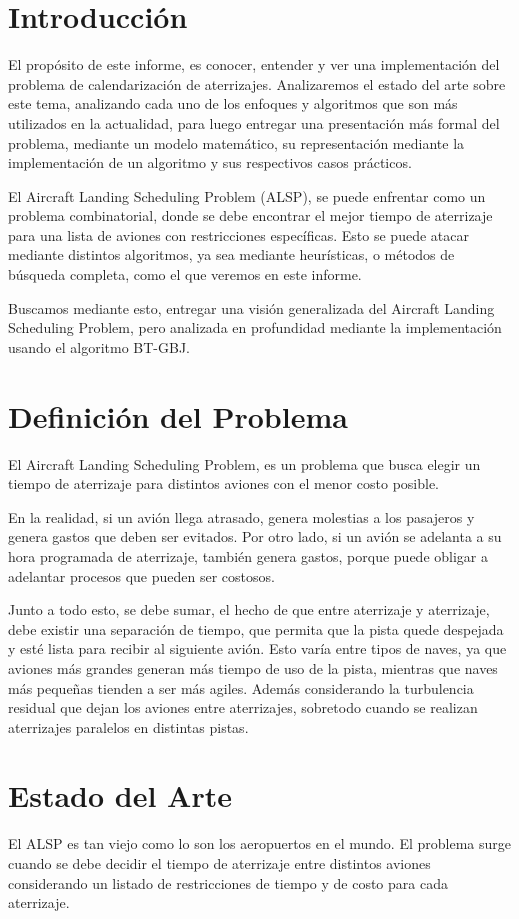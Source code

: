 \documentclass[letter, 11pt]{article}
\begin{document}
\section{Introducci\'on}
El propósito de este informe, es conocer, entender y ver una implementación del problema de calendarización de aterrizajes. Analizaremos el estado del arte sobre este tema, analizando cada uno de los enfoques y algoritmos que son más utilizados en la actualidad, para luego entregar una presentación más formal del problema, mediante un modelo matemático, su representación mediante la implementación de un algoritmo y sus respectivos casos prácticos.

El Aircraft Landing Scheduling Problem (ALSP), se puede enfrentar como un problema combinatorial, donde se debe encontrar el mejor tiempo de aterrizaje para una lista de aviones con restricciones específicas. Esto se puede atacar mediante distintos algoritmos, ya sea mediante heurísticas, o métodos de búsqueda completa, como el que veremos en este informe.

Buscamos mediante esto, entregar una visión generalizada del Aircraft Landing Scheduling Problem, pero analizada en profundidad mediante la implementación usando el algoritmo BT-GBJ.


\section{Definici\'on del Problema}
El Aircraft Landing Scheduling Problem, es un problema que busca elegir un tiempo de aterrizaje para distintos aviones con el menor costo posible.

En la realidad, si un avión llega atrasado, genera molestias a los pasajeros y genera gastos que deben ser evitados. Por otro lado, si un avión se adelanta a su hora programada de aterrizaje, también genera gastos, porque puede obligar a adelantar procesos que pueden ser costosos.

Junto a todo esto, se debe sumar, el hecho de que entre aterrizaje y aterrizaje, debe existir una separación de tiempo, que permita que la pista quede despejada y esté lista para recibir al siguiente avión. Esto varía entre tipos de naves, ya que aviones más grandes generan más tiempo de uso de la pista, mientras que naves más pequeñas tienden a ser más agiles. Además considerando la turbulencia residual que dejan los aviones entre aterrizajes, sobretodo cuando se realizan aterrizajes paralelos en distintas pistas.


\section{Estado del Arte}
El ALSP es tan viejo como lo son los aeropuertos en el mundo. El problema surge cuando se debe decidir el tiempo de aterrizaje entre distintos aviones considerando un listado de restricciones de tiempo y de costo para cada aterrizaje.
\end{document}
